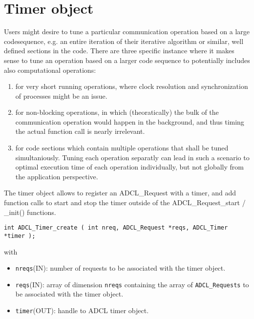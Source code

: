 \section{Timer object}

Users might desire to tune a particular communication operation based on a
large codesequence, e.g. an entire iteration of their iterative algorithm or
similar, well defined sections in the code. There are three specific instance
where it makes sense to tune an operation based on a larger code sequence to
potentially includes also computational operations:

\begin{enumerate}

\item for very short running operations, where clock resolution and
  synchronization of processes might be an issue.

\item for non-blocking operations, in which (theoratically) the bulk of the
  communication operation would happen in the background, and thus timing the
  actual function call is nearly irrelevant.

\item for code sections which contain multiple operations that shall be tuned
  simultaniously. Tuning each operation separatly can lead in such a scenario
  to optimal execution time of each operation individually, but not globally
  from the application perspective.

\end{enumerate}

The timer object allows to register an ADCL\_Request with a timer, and add
function calls to start and stop the timer outside of the
ADCL\_Request\_start / \_init() functions.

\begin{verbatim}
int ADCL_Timer_create ( int nreq, ADCL_Request *reqs, ADCL_Timer *timer );
\end{verbatim}
with
\begin{itemize}
\item {\tt nreqs}(IN): number of requests to be associated with the timer object.
\item {\tt reqs}(IN): array of dimension {\tt nreqs} containing the array of
  {\tt ADCL\_Requests} to be associated with the timer object.
\item {\tt timer}(OUT): handle to ADCL timer object.
\end{itemize}


